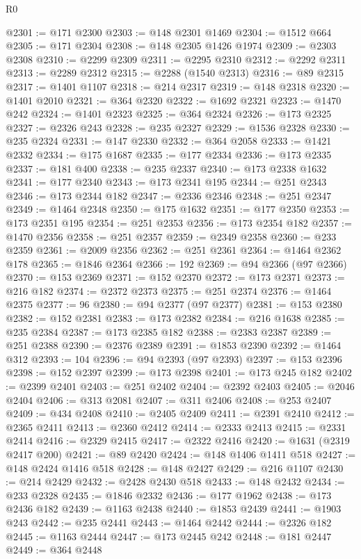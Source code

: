 \begin{lexlean}{R0}
\begin{coremodule}
@2301 := @171 @2300
@2303 := @148 @2301 @1469
@2304 := @1512 @664
@2305 := @171 @2304
@2308 := @148 @2305 @1426 @1974
@2309 := @2303 @2308
@2310 := @2299 @2309
@2311 := @2295 @2310
@2312 := @2292 @2311
@2313 := @2289 @2312
@2315 := @2288 (@1540 @2313)
@2316 := @89 @2315
@2317 := @1401 @1107
@2318 := @214 @2317
@2319 := @148 @2318
@2320 := @1401 @2010
@2321 := @364 @2320
@2322 := @1692 @2321
@2323 := @1470 @242
@2324 := @1401 @2323
@2325 := @364 @2324
@2326 := @173 @2325
@2327 := @2326 @243
@2328 := @235 @2327
@2329 := @1536 @2328
@2330 := @235 @2324
@2331 := @147 @2330
@2332 := @364 @2058
@2333 := @1421 @2332
@2334 := @175 @1687
@2335 := @177 @2334
@2336 := @173 @2335
@2337 := @181 @400
@2338 := @235 @2337
@2340 := @173 @2338 @1632
@2341 := @177 @2340
@2343 := @173 @2341 @195
@2344 := @251 @2343
@2346 := @173 @2344 @182
@2347 := @2336 @2346
@2348 := @251 @2347
@2349 := @1464 @2348
@2350 := @175 @1632
@2351 := @177 @2350
@2353 := @173 @2351 @195
@2354 := @251 @2353
@2356 := @173 @2354 @182
@2357 := @1470 @2356
@2358 := @251 @2357
@2359 := @2349 @2358
@2360 := @233 @2359
@2361 := @2009 @2356
@2362 := @251 @2361
@2364 := @1464 @2362 @178
@2365 := @1846 @2364
@2366 := 192
@2369 := @94 @2366 (@97 @2366)
@2370 := @153 @2369
@2371 := @152 @2370
@2372 := @173 @2371
@2373 := @216 @182
@2374 := @2372 @2373
@2375 := @251 @2374
@2376 := @1464 @2375
@2377 := 96
@2380 := @94 @2377 (@97 @2377)
@2381 := @153 @2380
@2382 := @152 @2381
@2383 := @173 @2382
@2384 := @216 @1638
@2385 := @235 @2384
@2387 := @173 @2385 @182
@2388 := @2383 @2387
@2389 := @251 @2388
@2390 := @2376 @2389
@2391 := @1853 @2390
@2392 := @1464 @312
@2393 := 104
@2396 := @94 @2393 (@97 @2393)
@2397 := @153 @2396
@2398 := @152 @2397
@2399 := @173 @2398
@2401 := @173 @245 @182
@2402 := @2399 @2401
@2403 := @251 @2402
@2404 := @2392 @2403
@2405 := @2046 @2404
@2406 := @313 @2081
@2407 := @311 @2406
@2408 := @253 @2407
@2409 := @434 @2408
@2410 := @2405 @2409
@2411 := @2391 @2410
@2412 := @2365 @2411
@2413 := @2360 @2412
@2414 := @2333 @2413
@2415 := @2331 @2414
@2416 := @2329 @2415
@2417 := @2322 @2416
@2420 := @1631 (@2319 @2417 @200)
@2421 := @89 @2420
@2424 := @148 @1406 @1411 @518
@2427 := @148 @2424 @1416 @518
@2428 := @148 @2427
@2429 := @216 @1107
@2430 := @214 @2429
@2432 := @2428 @2430 @518
@2433 := @148 @2432
@2434 := @233 @2328
@2435 := @1846 @2332
@2436 := @177 @1962
@2438 := @173 @2436 @182
@2439 := @1163 @2438
@2440 := @1853 @2439
@2441 := @1903 @243
@2442 := @235 @2441
@2443 := @1464 @2442
@2444 := @2326 @182
@2445 := @1163 @2444
@2447 := @173 @2445 @242
@2448 := @181 @2447
@2449 := @364 @2448

\end{coremodule}
\end{lexlean}
